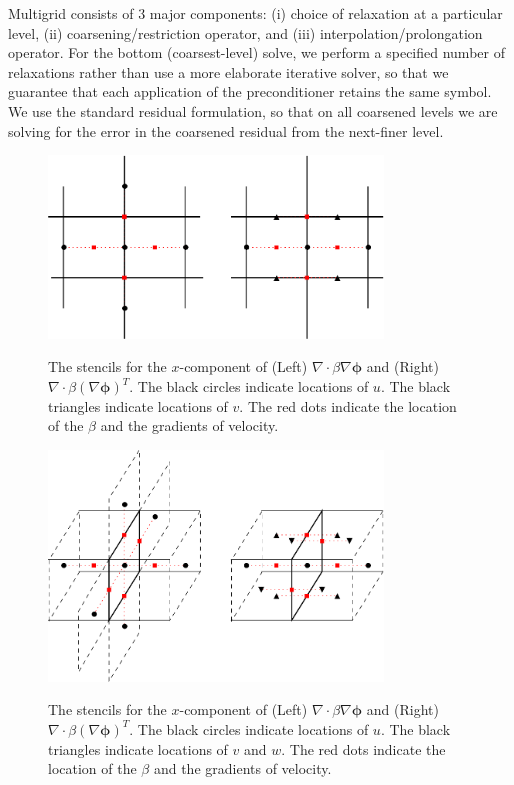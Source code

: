 \documentclass[final]{siamltex}
\def\phib {\boldsymbol{\phi}}
\begin{document}
Multigrid consists of 3 major components: (i) choice of relaxation at a particular level,
(ii) coarsening/restriction operator, and (iii) interpolation/prolongation operator.
For the bottom (coarsest-level) solve, we perform a specified number of relaxations
rather than use a more elaborate iterative solver, so that we guarantee that each
application of the preconditioner retains the same symbol.  We use the standard residual
formulation, so that on all coarsened levels we are solving for the error in the
coarsened residual from the next-finer level.

\begin{figure}[tb]
\centering
\includegraphics[width=3.5in]{viscOp}
\label{fig:viscOp}
\caption{The stencils for the $x$-component of (Left) $\nabla\cdot\beta\nabla\phib$ and 
(Right) $\nabla\cdot\beta(\nabla\phib)^T$.  
The black circles indicate locations of $u$.
The black triangles indicate locations of $v$.
The red dots indicate the location of the $\beta$ and the gradients of velocity.}
\end{figure}
\begin{figure}[tb]
\centering
\includegraphics[width=3.5in]{viscOp_3d}
\label{fig:viscOp_3d}
\caption{The stencils for the $x$-component of (Left) $\nabla\cdot\beta\nabla\phib$ and
(Right) $\nabla\cdot\beta(\nabla\phib)^T$.  
The black circles indicate locations of $u$.
The black triangles indicate locations of $v$ and $w$.
The red dots indicate the location of the $\beta$ and the gradients of velocity.}
\end{figure}
\end{document}
